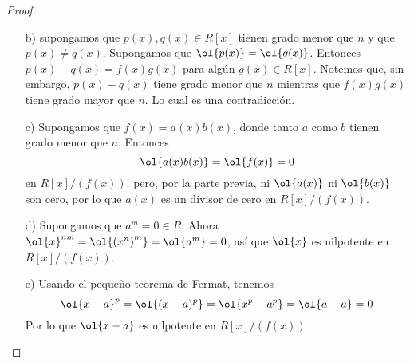 \begin{proof}
\begin{enumerate}
        \item[b)] supongamos que $p(x), q(x) \in R[x]$ tienen grado menor que $n$ y que $p(x) \neq q(x)$. Supongamos que $\ol{p(x)} = \ol{q(x)}$. Entonces $p(x) - q(x) = f(x)g(x)$ para algún $g(x) \in R[x]$. Notemos que, sin embargo, $p(x) - q(x)$ tiene grado menor que $n$ mientras que $f(x)g(x)$ tiene grado mayor que $n$. Lo cual es una contradicción.
        
        \item[c)] Supongamos que $f(x) = a(x)b(x)$, donde tanto $a$ como $b$ tienen grado menor que $n$. Entonces
        $$ \ol{a(x)b(x)} = \ol{f(x)} = 0$$
        en $R[x]/(f(x))$. pero, por la parte previa, ni $\ol{a(x)}$ ni $\ol{b(x)}$ son cero, por lo que $a(x)$ es un divisor de cero en $R[x]/(f(x))$.

        \item[d)] Supongamos que $a^m = 0 \in R$, Ahora $\ol{x}^{nm} = \ol{{(x^n)}^m} = \ol{a^m} = 0$, así que $\ol{x}$ es nilpotente en $R[x]/(f(x))$.
        
        \item[e)] Usando el pequeño teorema de Fermat, tenemos 
        $$ \ol{x-a}^p = \ol{(x-a)^p} = \ol{x^p-a^p} = \ol{a-a} = 0 $$
        Por lo que $\ol{x-a}$ es nilpotente en $R[x]/(f(x))$
    \end{enumerate}
\end{proof}